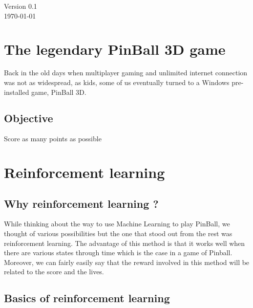 \documentclass[a4paper,12pt,calibri,oneside,openany]{book}
\theoremstyle{break}
\begin{document}
\begin{titlepage}
\begin{center}
\vfill

{\large Version 0.1\\ \today}

\end{center}
\end{titlepage}


\frontmatter



\tableofcontents

\mainmatter
\pagestyle{fancy}
\chapter{The legendary PinBall 3D game}
Back in the old days when multiplayer gaming and unlimited internet connection was not as widespread, as kids, some of us eventually turned to a Windows pre-installed game, PinBall 3D.
\section{Objective}
Score as many points as possible
\chapter{Reinforcement learning}
\section{Why reinforcement learning ?}
\qquad While thinking about the way to use Machine Learning to play PinBall, we thought of various possibilities but the one that stood out from the rest was reinforcement learning. The advantage of this method is that it works well when there are various states through time which is the case in a game of Pinball. Moreover, we can fairly easily say that the reward involved in this method will be related to the score and the lives.
\section{Basics of reinforcement learning}
\end{document}
